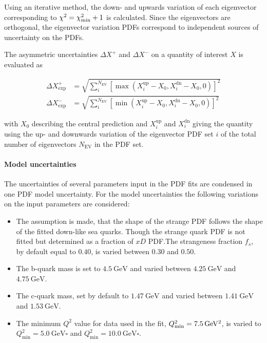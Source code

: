 Using an iterative method, the down- and upwards variation of each eigenvector
corresponding to $\chi^2 = \chi^2_{\mathrm{min}} + 1$ is calculated. Since the
eigenvectors are orthogonal, the eigenvector variation PDFs correspond to
independent sources of uncertainty on the PDFs.

The asymmetric uncertainties $\Delta X^+$ and $\Delta X^-$ on a quantity of
interest $X$ is evaluated as

\begin{align*}
  \Delta X^+_{\mathrm{exp}} &= \sqrt{\sum_i^{N_{\mathrm{EV}}} \left[ \max(X_i^{\mathrm{up}}
    -X_0, X_i^{\mathrm{dn}} - X_0, 0)\right]^2}\\
    \Delta X^-_{\mathrm{exp}} &= \sqrt{\sum_i^{N_{\mathrm{EV}}} \left[ \min(X_i^{\mathrm{up}} - X_0, X_i^{\mathrm{dn}} - X_0,0)\right]^2}
\end{align*}

with $X_0$ describing the central prediction and $X_i^{\mathrm{up}}$ and
$X_i^{\mathrm{dn}}$ giving the quantity using the up- and downwards variation of
the eigenvector PDF set $i$ of the total number of eigenvectors
$N_{\mathrm{EV}}$ in the PDF set.


\paragraph{Model uncertainties} The uncertainties of several parameters input in the PDF fits are condensed in
one PDF model uncertainty. For the model uncertainties the following variations
on the input parameters are considered:

\begin{itemize}
\item The assumption is made, that the shape of the strange PDF follows the
  shape of the fitted down-like sea quarks. Though the strange quark PDF is not
  fitted but determined as a fraction of $xD$ PDF.The strangeness fraction
  $f_s$, by default equal to $0.40$, is varied between $0.30$ and $0.50$.
  \item The b-quark mass is set to $\SI{4.5}{\GeV}$ and varied between
  $\SI{4.25}{\GeV}$ and $\SI{4.75}{\GeV}$.
  \item The c-quark mass, set by default to $\SI{1.47}{\GeV}$ and varied between
  $\SI{1.41}{\GeV}$ and $\SI{1.53}{\GeV}$.
  \item The minimum $Q^2$ value for data used in the fit,
    $Q^2_\mathrm{min}=\SI{7.5}{\GeVsq}$, is varied to $Q^2_\mathrm{min} =
    \SI{5.0}{\GeV\square}$ and $Q^2_\mathrm{min} = \SI{10.0}{\GeV\square}$.
\end{itemize}


